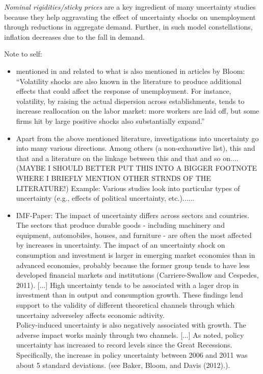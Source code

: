 \documentclass[a4paper,11pt,listof=nochaptergap,oneside,pointednumbers,bibtotoc,bigheadings,liststotoc]{scrbook}
\begin{document}
\textit{Nominal rigidities/sticky prices} are a key ingredient of many uncertainty studies because they help aggravating the effect of uncertainty shocks on unemployment through reductions in aggregate demand. Further, in such model constellations, inflation decreases due to the fall in demand.

\begingroup
    \fontsize{8pt}{12pt}\selectfont
    Note to self:
\begin{itemize}
	\item mentioned in \citet{schaal:17} and related to what is also mentioned in articles by Bloom: ``Volatility shocks are also known in the literature to produce additional effects that could affect the response of unemployment. For instance, volatility, by raising the actual dispersion across establishments, tends to increase reallocation on the labor market: more workers are laid off, but some firms hit by large positive shocks also substantially expand.''
	\item Apart from the above mentioned literature, investigations into uncertainty go into many various directions. Among others (a non-exhaustive list), this and that and a literature on the linkage between this and that and so on....(MAYBE I SHOULD BETTER PUT THIS INTO A BIGGER FOOTNOTE WHERE I BRIEFLY MENTION OTHER STRNDS OF THE LITERATURE!) Example: Various studies look into particular types of uncertainty (e.g., effects of political uncertainty, etc.)......
	\item
	IMF-Paper:	
	The impact of uncertainty differs across sectors and countries. The sectors that produce durable goods - including machinery and equipment, automobiles, houses, and furniture - are often the most affected by increases in uncertainty. The impact of an uncertainty shock on consumption and investment is larger in emerging market economies than in advanced economies, probably because the former group tends to have less developed financial markets and institutions (Carriere-Swallow and Cespedes, 2011). [...] High uncertainty tends to be associated with a lager drop in investment than in output and consumption growth. These findings lend support to the validity of different theoretical channels through which uncertainy adverseley affects economic adtivity. \\
	Policy-induced uncertainty is also negatively associated with growth. The adverse impact works mainly through two channels. [...] As noted, policy uncertainty has increased to record levels since the Great Recessions. Specifically, the increase in policy uncertainty between 2006 and 2011 was about 5 standard deviations. (see Baker, Bloom, and Davis (2012).).

\end{itemize}
\end{document}

